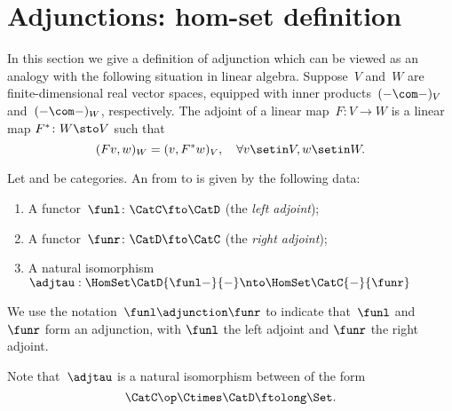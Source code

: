 

\section{Adjunctions: hom-set definition}
In this section we give a definition of adjunction which can be viewed as an analogy with the following situation in linear algebra.
Suppose~$V$ and~$W$ are finite-dimensional real vector spaces, equipped with inner products~$(-\com -)_V$ and~$(- \com -)_W$, respectively.
The adjoint of a linear map~$F\colon V \to W$ is a linear map $F^*\colon W \sto V$ such that
\begin{equation}
    (Fv, w)
    _W = (v, F^*w)_V, \quad \forall v \setin V, w \setin W.
\end{equation}

\begin{ctdefinition}
    \label{def:adj-iso}
    \label{def:cat-adjunction-v1}
    Let \CatC and \CatD be categories.
    An \emph{} from \CatC to \CatD is given by the following data:
    \begin{enumerate}
        \item A functor~$\funl\colon \CatC \fto \CatD$ (the \emph{left adjoint});
        \item A functor~$\funr\colon \CatD \fto \CatC$ (the \emph{right adjoint});
        \item A natural isomorphism~$\adjtau: \HomSet\CatD{\funl -}{-} \nto \HomSet\CatC{-}{\funr}$
    \end{enumerate}
    We use the notation~$\funl \adjunction  \funr$ to indicate that~$\funl$ and~$\funr$ form an adjunction, with $\funl$ the left adjoint and $\funr$ the right adjoint.
\end{ctdefinition}

\begin{remark}
    Note that~$\adjtau$ is a natural isomorphism between  of the form
    \begin{equation}
        \CatC\op \Ctimes \CatD \ftolong   \Set.
    \end{equation}
\end{remark}

